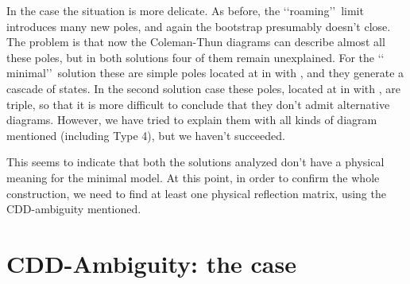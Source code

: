 \documentclass[a4paper,12pt]{report}
\begin{document}
\vspace{0.5cm}

In the \coordHE{} case the situation is more delicate. As before, the \lq\lq roaming\rq\rq \, limit introduces many
new poles, and again the bootstrap presumably doesn't close. The problem is that now the Coleman-Thun diagrams
can describe almost all these poles, but in both solutions four of them remain unexplained. For the \lq\lq
minimal\rq\rq \, solution these are simple poles located at \coordHE{} in \coordHE{} with
\coordHE{}, and they generate a cascade of states. In the second solution
case these poles, located at \coordHE{} in \coordHE{} with
\coordHE{}, are triple, so that it is more difficult to conclude that they
don't admit alternative diagrams. However, we have tried to explain them with all kinds of diagram mentioned
(including Type 4), but we haven't succeeded.

This seems to indicate that both the solutions analyzed don't have a physical meaning for the minimal model. At
this point, in order to confirm the whole construction, we need to find at least one physical reflection matrix,
using the CDD-ambiguity mentioned.

\vspace{1cm}


\section{CDD-Ambiguity: the \coordHE{} case}
\end{document}
